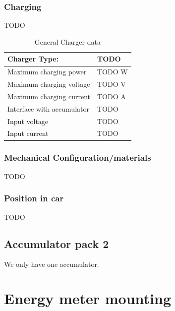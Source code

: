 \documentclass{article}
\begin{document}
\subsubsection{Charging}
TODO

	\begin{table}[H]
	    \centering
	    \begin{tabular}{|l|l|}
	        \hline
	        Charger Type: & TODO \\ \hline
	        Maximum charging power & TODO W \\ \hline
	        Maximum charging voltage & TODO V \\ \hline
	        Maximum charging current & TODO A \\ \hline
	        Interface with accumulator & TODO \\ \hline
	        Input voltage & TODO \\ \hline
	        Input current & TODO \\ \hline
	    \end{tabular}
	    \caption{General Charger data}
	    \label{charger}
	\end{table}

\subsubsection{Mechanical Configuration/materials}
TODO

\subsubsection{Position in car}
TODO

\subsection{Accumulator pack 2}
We only have one accumulator.

\section{Energy meter mounting}
\end{document}
